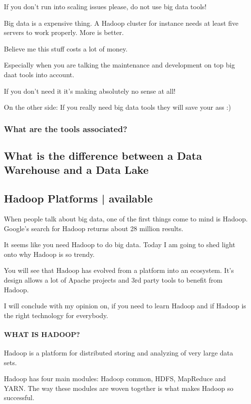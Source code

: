 \documentclass[12pt]{scrartcl} %
\begin{document}
If you don’t run into scaling issues please, do not use big data tools!

Big data is a expensive thing. A Hadoop cluster for instance needs at least five servers to work properly. More is better.

Believe me this stuff costs a lot of money.

Especially when you are talking the maintenance and development on top big daat tools into account.

If you don’t need it it’s making absolutely no sense at all!

On the other side: If you really need big data tools they will save your ass :)

\subsubsection{What are the tools associated?}



\subsection{What is the difference between a Data Warehouse and a Data Lake}

\subsection{Hadoop Platforms | available}
When people talk about big data, one of the first things come to mind is Hadoop. Google’s search for Hadoop returns about 28 million results.

It seems like you need Hadoop to do big data. Today I am going to shed light onto why Hadoop is so trendy.

You will see that Hadoop has evolved from a platform into an ecosystem. It’s design allows a lot of Apache projects and 3rd party tools to benefit from Hadoop.

I will conclude with my opinion on, if you need to learn Hadoop and if Hadoop is the right technology for everybody.

\paragraph{WHAT IS HADOOP?}

Hadoop is a platform for distributed storing and analyzing of very large data sets.

Hadoop has four main modules: Hadoop common, HDFS, MapReduce and YARN. The way these modules are woven together is what makes Hadoop so successful.
\end{document}
